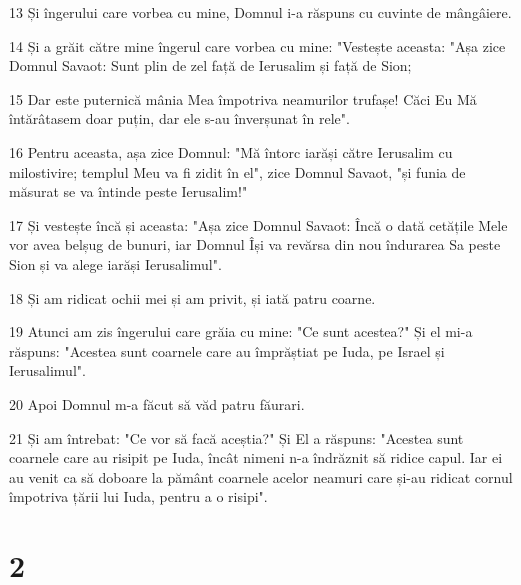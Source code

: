 \par 13 Și îngerului care vorbea cu mine, Domnul i-a răspuns cu cuvinte de mângâiere.
\par 14 Și a grăit către mine îngerul care vorbea cu mine: "Vestește aceasta: "Așa zice Domnul Savaot: Sunt plin de zel față de Ierusalim și față de Sion;
\par 15 Dar este puternică mânia Mea împotriva neamurilor trufașe! Căci Eu Mă întărâtasem doar puțin, dar ele s-au înverșunat în rele".
\par 16 Pentru aceasta, așa zice Domnul: "Mă întorc iarăși către Ierusalim cu milostivire; templul Meu va fi zidit în el", zice Domnul Savaot, "și funia de măsurat se va întinde peste Ierusalim!"
\par 17 Și vestește încă și aceasta: "Așa zice Domnul Savaot: Încă o dată cetățile Mele vor avea belșug de bunuri, iar Domnul Își va revărsa din nou îndurarea Sa peste Sion și va alege iarăși Ierusalimul".
\par 18 Și am ridicat ochii mei și am privit, și iată patru coarne.
\par 19 Atunci am zis îngerului care grăia cu mine: "Ce sunt acestea?" Și el mi-a răspuns: "Acestea sunt coarnele care au împrăștiat pe Iuda, pe Israel și Ierusalimul".
\par 20 Apoi Domnul m-a făcut să văd patru făurari.
\par 21 Și am întrebat: "Ce vor să facă aceștia?" Și El a răspuns: "Acestea sunt coarnele care au risipit pe Iuda, încât nimeni n-a îndrăznit să ridice capul. Iar ei au venit ca să doboare la pământ coarnele acelor neamuri care și-au ridicat cornul împotriva țării lui Iuda, pentru a o risipi".

\chapter{2}

